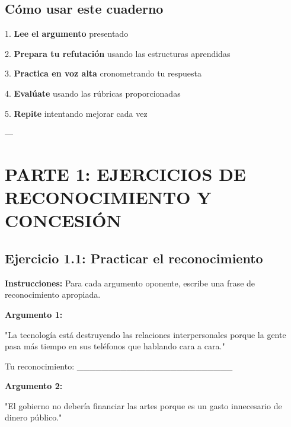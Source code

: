 \documentclass[a4paper,11pt]{article}
\begin{document}
\vspace{0.2cm}

\subsection{Cómo usar este cuaderno}

1. \textbf{Lee el argumento} presentado

2. \textbf{Prepara tu refutación} usando las estructuras aprendidas

3. \textbf{Practica en voz alta} cronometrando tu respuesta

4. \textbf{Evalúate} usando las rúbricas proporcionadas

5. \textbf{Repite} intentando mejorar cada vez

\vspace{0.2cm}

---

\vspace{0.2cm}

\section{PARTE 1: EJERCICIOS DE RECONOCIMIENTO Y CONCESIÓN}

\vspace{0.2cm}

\subsection{Ejercicio 1.1: Practicar el reconocimiento}

\vspace{0.2cm}

\textbf{Instrucciones:} Para cada argumento oponente, escribe una frase de reconocimiento apropiada.

\vspace{0.2cm}

\textbf{Argumento 1:}

"La tecnología está destruyendo las relaciones interpersonales porque la gente pasa más tiempo en sus teléfonos que hablando cara a cara."

\vspace{0.2cm}

Tu reconocimiento: _________________________

\vspace{0.2cm}

\textbf{Argumento 2:}

"El gobierno no debería financiar las artes porque es un gasto innecesario de dinero público."
\end{document}
